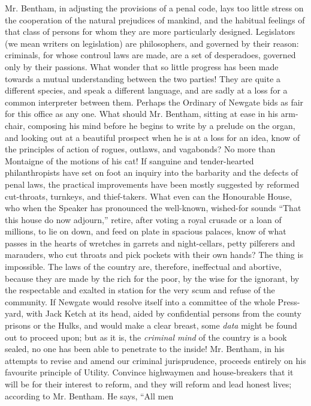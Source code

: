 Mr. Bentham, in adjusting the provisions of a penal code, lays too
little stress on the cooperation of the natural prejudices of
mankind, and the habitual feelings of that class of persons for
whom they are more particularly designed. Legislators (we mean
writers on legislation) are philosophers, and governed by their
reason: criminals, for whose controul laws are made, are a set of
desperadoes, governed only by their passions. What wonder that so
little progress has been made towards a mutual understanding
between the two parties! They are quite a different species, and
speak a different language, and are sadly at a loss for a common
interpreter between them. Perhaps the Ordinary of Newgate bids as
fair for this office as any one. What should Mr. Bentham, sitting
at ease in his arm-chair, composing his mind before he begins to
write by a prelude on the organ, and looking out at a beautiful
prospect when he is at a loss for an idea, know of the principles
of action of rogues, outlaws, and vagabonds? No more than
Montaigne of the motions of his cat! If sanguine and
tender-hearted philanthropists have set on foot an inquiry into
the barbarity and the defects of penal laws, the practical
improvements have been mostly suggested by reformed cut-throats,
turnkeys, and thief-takers. What even can the Honourable House,
who when the Speaker has pronounced the well-known, wished-for
sounds ``That this house do now adjourn,'' retire, after voting a
royal crusade or a loan of millions, to lie on down, and feed on
plate in spacious palaces, know of what passes in the hearts of
wretches in garrets and night-cellars, petty pilferers and
marauders, who cut throats and pick pockets with their own hands?
The thing is impossible. The laws of the country are, therefore,
ineffectual and abortive, because they are made by the rich for
the poor, by the wise for the ignorant, by the respectable and
exalted in station for the very scum and refuse of the
community. If Newgate would resolve itself into a committee of the
whole Press-yard, with Jack Ketch at its head, aided by
confidential persons from the county prisons or the Hulks, and
would make a clear breast, some \emph{data} might be found out to
proceed upon; but as it is, the \emph{criminal mind} of the
country is a book sealed, no one has been able to penetrate to the
inside! Mr. Bentham, in his attempts to revise and amend our
criminal jurisprudence, proceeds entirely on his favourite
principle of Utility.  Convince highwaymen and house-breakers that
it will be for their interest to reform, and they will reform and
lead honest lives; according to Mr. Bentham. He says, ``All men

